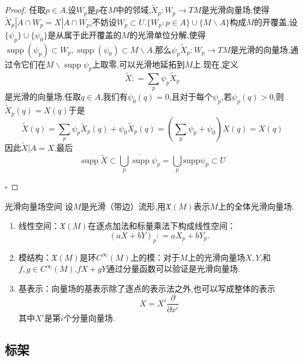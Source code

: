 \documentclass[../../几何与拓扑.tex]{subfiles}
\begin{document}
\begin{proof}
    任取$p \in A$,设$W_{p}$是$p$在$M$中的邻域,$\tilde{X}_{p}:W_{p}\to TM$是光滑向量场,使得$\tilde{X}_{p}|A\cap W_{p}= X|A\cap W_{p}$,不妨设$W_{p}\subset U$.$\{ W_{p} :p \in A\}\cup \{ M\backslash A \}$构成$M$的开覆盖,设$\{ \psi _{p} \}\cup \{ \psi _{0} \}$是从属于此开覆盖的$M$的光滑单位分解,使得$\operatorname{supp}\left( \psi _{p} \right)\subset W_{p},\operatorname{supp}\left( \psi _{0} \right)\subset M\backslash A$.那么$\psi _{p}\tilde{X}_{p}:W_{p}\to TM$是光滑的向量场,通过令它们在$M\backslash \operatorname{supp}\psi _{p}$上取零,可以光滑地延拓到$M$上.现在,定义 $$ \tilde{X}: = \sum _{p}\psi _{p}\tilde{X}_{p} $$是光滑的向量场.任取$q \in A$,我们有$\psi _{0}\left( q \right)=0$,且对于每个$\psi _{p}$,若$\psi _{p}\left( q \right)>0$,则$\tilde{X}_{p}\left( q \right)= X\left( q \right)$于是 $$ \tilde{X}\left( q \right) =\sum _{p}\psi _{p}\tilde{X}_{p}\left( q \right) +\psi _{0} \tilde{X}_{p}\left( q \right)=\left( \sum _{p}\psi _{p}+\psi _{0} \right) X\left( q \right) =X\left( q \right)   $$因此$\tilde{X}|A=X$.最后 $$ \operatorname{supp}\tilde{X}\subset  \overline{\bigcup _{p}\operatorname{supp}\psi _{p}}=\bigcup _{p}\operatorname{supp\psi _{p}}\subset U $$

    \hfill $\square$
\end{proof}

\begin{definition}{光滑向量场空间}
    设$M$是光滑（带边）流形,用$\mathfrak{X}\left( M \right)$表示$M$上的全体光滑向量场.
\end{definition}
\begin{remark}
    \begin{enumerate}
        \item 线性空间：$\mathfrak{X}\left( M \right)$在逐点加法和标量乘法下构成线性空间：  $$ \left( aX+bY \right) _{p}: = aX_{p}+bY_{p}. $$
        \item 模结构：$\mathfrak{X}\left( M \right)$是环$C^{\infty}\left( M \right)$上的模：对于$M$上的光滑向量场$X,Y$,和$f,g \in C^{\infty}\left( M \right)$,$fX+gY$通过分量函数可以验证是光滑向量场.

        \item 基表示：向量场的基表示除了逐点的表示法之外,也可以写成整体的表示 $$ X= X^{i} \frac{ \partial  }{ \partial x^{i} }  $$其中$X^{i}$是第$i$个分量向量场.
    \end{enumerate}
    
\end{remark}

\subsection{标架}
\end{document}
